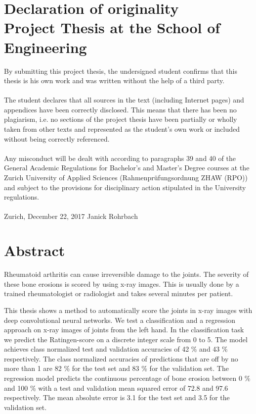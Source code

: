 \documentclass[12pt]{article}
\begin{document}
\section*{Declaration of originality\\ \large{Project Thesis at the School of Engineering}}
By submitting this project thesis, the undersigned student confirms that this thesis is his own work and was written without the help of a third party. \\
\\
The student declares that all sources in the text (including Internet pages) and appendices have been correctly disclosed. This means that there has been no plagiarism, i.e. no sections of the project thesis have been partially or wholly taken from other texts and represented as the student’s own work or included without being correctly referenced. \\
\\
Any misconduct will be dealt with according to paragraphs 39 and 40 of the General Academic Regulations for Bachelor’s and Master’s Degree courses at the Zurich University of Applied Sciences (Rahmenprüfungsordnung ZHAW (RPO)) and subject to the provisions for disciplinary action stipulated in the University regulations.\\
\vspace{3cm} \\
Zurich, December 22, 2017 \hspace{5cm} Janick Rohrbach

\newpage

\section*{Abstract}

Rheumatoid arthritis can cause irreversible damage to the joints. The severity of these bone erosions is scored by using x-ray images. This is usually done by a trained rheumatologist or radiologist and takes several minutes per patient.

This thesis shows a method to automatically score the joints in x-ray images with deep convolutional neural networks. We test a classification and a regression approach on x-ray images of joints from the left hand. In the classification task we predict the Ratingen-score on a discrete integer scale from 0 to 5. The model achieves class normalized test and validation accuracies of 42 \% and 43 \% respectively. The class normalized accuracies of predictions that are off by no more than 1 are 82 \% for the test set and 83 \% for the validation set. The regression model predicts the continuous percentage of bone erosion between 0 \% and 100 \% with a test and validation mean squared error of 72.8 and 97.6 respectively. The mean absolute error is 3.1 for the test set and 3.5 for the validation set.
\end{document}
